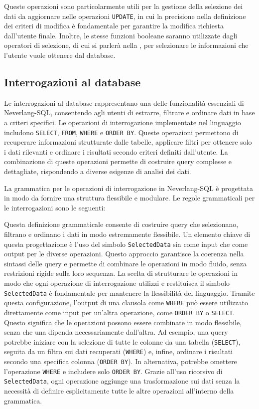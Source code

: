 \documentclass[12pt,a4paper,openright,twoside]{book}
\begin{document}
Queste operazioni sono particolarmente utili per la gestione della selezione dei dati da aggiornare nelle operazioni \texttt{UPDATE}, in cui 
la precisione nella definizione dei criteri di modifica è fondamentale per garantire la modifica richiesta dall'utente finale. 
Inoltre, le stesse funzioni booleane saranno utilizzate dagli operatori di selezione, di cui si parlerà nella 
, per selezionare le informazioni che l'utente vuole ottenere dal database.

\subsection{Interrogazioni al database}
\label{subsec:interrogazioni}
Le interrogazioni al database rappresentano una delle funzionalità essenziali di Neverlang-SQL, consentendo agli utenti di estrarre, 
filtrare e ordinare dati in base a criteri specifici. Le operazioni di interrogazione implementate nel linguaggio includono \texttt{SELECT}, 
\texttt{FROM}, \texttt{WHERE} e \texttt{ORDER BY}. Queste operazioni permettono di recuperare informazioni strutturate dalle tabelle, applicare filtri per 
ottenere solo i dati rilevanti e ordinare i risultati secondo criteri definiti dall’utente. La combinazione di queste operazioni 
permette di costruire query complesse e dettagliate, rispondendo a diverse esigenze di analisi dei dati.

La grammatica per le operazioni di interrogazione in Neverlang-SQL è progettata in modo da fornire una struttura flessibile e 
modulare. Le regole grammaticali per le interrogazioni sono le seguenti:


Questa definizione grammaticale consente di costruire query che selezionano, filtrano e ordinano i dati in modo estremamente 
flessibile. Un elemento chiave di questa progettazione è l’uso del simbolo \texttt{SelectedData} sia come input che come output per 
le diverse operazioni. Questo approccio garantisce la coerenza nella sintassi delle query e permette di combinare le operazioni in 
modo fluido, senza restrizioni rigide sulla loro sequenza. La scelta di strutturare le operazioni in modo che ogni operazione di 
interrogazione utilizzi e restituisca il simbolo \texttt{SelectedData} è fondamentale per mantenere la flessibilità del linguaggio. 
Tramite questa configurazione, l’output di una clausola come \texttt{WHERE} può essere utilizzato direttamente come input per un’altra 
operazione, come \texttt{ORDER BY} o \texttt{SELECT}. Questo significa che le operazioni possono essere combinate in modo flessibile, senza che una 
dipenda necessariamente dall’altra. Ad esempio, una query potrebbe iniziare con la selezione di tutte le colonne da una tabella 
(\texttt{SELECT}), seguita da un filtro sui dati recuperati (\texttt{WHERE}) e, infine, ordinare i risultati secondo una 
specifica colonna (\texttt{ORDER BY}). In alternativa, potrebbe omettere l’operazione \texttt{WHERE} e includere solo \texttt{ORDER BY}. Grazie all’uso 
ricorsivo di \texttt{SelectedData}, ogni operazione aggiunge una trasformazione sui dati senza la necessità di definire 
esplicitamente tutte le altre operazioni all’interno della grammatica.
\end{document}
